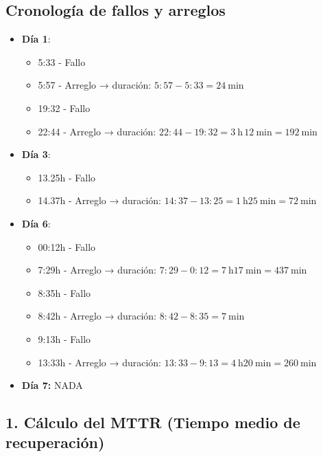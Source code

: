 \subsection{Cronología de fallos y arreglos}\label{subsec:cronologia-de-fallos-y-arreglos}

\begin{itemize}
    \item \textbf{Día 1}:
    \begin{itemize}
        \item 5:33 - Fallo
        \item 5:57 - Arreglo → duración: $5:57 - 5:33 = \qty{24}{\minute}$
        \item 19:32 - Fallo
        \item 22:44 - Arreglo → duración: $22:44 - 19:32 = \qty{3}{\hour}\,\qty{12}{\minute} = \qty{192}{\minute}$
    \end{itemize}
    \item \textbf{Día 3}:
    \begin{itemize}
        \item 13.25h - Fallo
        \item 14.37h - Arreglo → duración: $14:37 - 13:25 = \qty{1}{\hour}\qty{25}{\minute}=\qty{72}{\minute}$
    \end{itemize}
    \item \textbf{Día 6}:
    \begin{itemize}
        \item  00:12h - Fallo
        \item  7:29h - Arreglo → duración: $7:29 - 0:12 = \qty{7}{\hour}\qty{17}{\minute} = \qty{437}{\minute}$
        \item  8:35h - Fallo
        \item  8:42h - Arreglo → duración: $8:42 - 8:35 = \qty{7}{\minute}$
        \item  9:13h - Fallo
        \item 13:33h - Arreglo → duración: $13:33 - 9:13 = \qty{4}{\hour}\qty{20}{\minute} = \qty{260}{\minute}$
    \end{itemize}
    \item \textbf{Día 7:}
    NADA
\end{itemize}

\subsection{1. Cálculo del MTTR (Tiempo medio de recuperación)}\label{subsec:1.-calculo-del-mttr-(tiempo-medio-de-recuperacion)}

